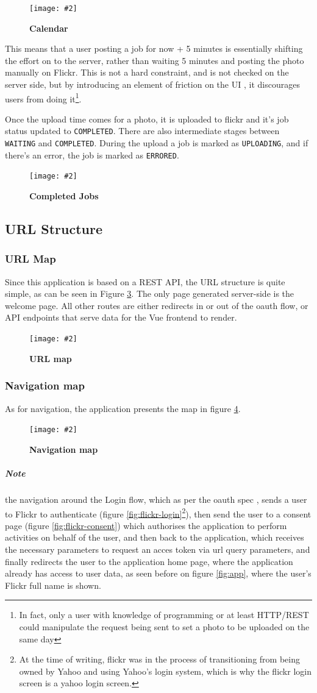 \documentclass[10pt, a4paper]{article}
\newcommand{\figuremacro}[5]{
\begin{figure}[#1]
\centering
\texttt{[image: \#2]}
\caption[#3]{\textbf{#3}#4}
\label{fig:#2}
\end{figure}
}
\begin{document}
        \figuremacro{h}{time-picker}{Calendar}{}{1.0}

        This means that a user posting a job for now + 5 minutes is essentially shifting the effort on to the server, rather than waiting 5 minutes and posting the photo manually on Flickr.
        This is not a hard constraint, and is not checked on the server side, but by introducing an element of friction on the UI \cite{ui_friction}, it discourages users from doing it\footnote{\label{ft:friction} In fact, only a user with knowledge of programming or at least HTTP/REST could manipulate the request being sent to set a photo to be uploaded on the same day}.

        Once the upload time comes for a photo, it is uploaded to flickr and it's job status updated to \texttt{COMPLETED}. There are also intermediate stages between \texttt{WAITING} and \texttt{COMPLETED}. During the upload a job is marked as \texttt{UPLOADING}, and if there's an error, the job is marked as \texttt{ERRORED}.

				\figuremacro{h}{completed-jobs}{Completed Jobs}{}{1.0}        

        \subsection{URL Structure}
        \subsubsection{URL Map}
        Since this application is based on a REST API, the URL structure is quite simple, as can be seen in Figure \ref{fig:url-map}. The only page generated server-side is the welcome page. All other routes are either redirects in or out of the oauth flow, or API endpoints that serve data for the Vue frontend to render.


        \figuremacro{h}{url-map}{URL map}{}{1.0}


        \subsubsection{Navigation map}
        As for navigation, the application presents the map in figure \ref{fig:nav-map}.

        \figuremacro{h}{nav-map}{Navigation map}{}{1.0}


        \subparagraph{Note} the navigation around the Login flow, which as per the oauth spec \cite{oauth}, sends a user to Flickr to authenticate (figure \ref{fig:flickr-login}\footnote{\label{ft:yahoo} At the time of writing, flickr was in the process of transitioning from being owned by Yahoo and using Yahoo's login system, which is why the flickr login screen is a yahoo login screen.}), then send the user to a consent page (figure \ref{fig:flickr-consent}) which authorises the application to perform activities on behalf of the user, and then back to the application, which receives the necessary parameters to request an acces token via url query parameters, and finally redirects the user to the application home page, where the application already has access to user data, as seen before on figure \ref{fig:app}, where the user's Flickr full name is shown.
\end{document}
